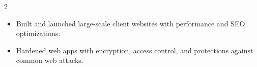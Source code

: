 \documentclass[10pt,a4paper,ragged2e,withhyper]{altacv}
\begin{document}
\begin{paracol}{2}
\divider


\begin{itemize}
\item Built and launched large-scale client websites with performance and SEO optimizations.

\item Hardened web apps with encryption, access control, and protections against common web attacks.
\end{itemize}






\newpage




\end{paracol}
\end{document}
